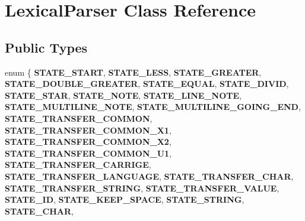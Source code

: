 \hypertarget{class_lexical_parser}{}\section{Lexical\+Parser Class Reference}
\label{class_lexical_parser}
\subsection*{Public Types}
\begin{DoxyCompactItemize}
\item 
\mbox{\label{class_lexical_parser_ad0c3684f404a4ac58f189d49f89344c7}} 
enum \{ \newline
{\bfseries S\+T\+A\+T\+E\+\_\+\+S\+T\+A\+RT}, 
{\bfseries S\+T\+A\+T\+E\+\_\+\+L\+E\+SS}, 
{\bfseries S\+T\+A\+T\+E\+\_\+\+G\+R\+E\+A\+T\+ER}, 
{\bfseries S\+T\+A\+T\+E\+\_\+\+D\+O\+U\+B\+L\+E\+\_\+\+G\+R\+E\+A\+T\+ER}, 
\newline
{\bfseries S\+T\+A\+T\+E\+\_\+\+E\+Q\+U\+AL}, 
{\bfseries S\+T\+A\+T\+E\+\_\+\+D\+I\+V\+ID}, 
{\bfseries S\+T\+A\+T\+E\+\_\+\+S\+T\+AR}, 
{\bfseries S\+T\+A\+T\+E\+\_\+\+N\+O\+TE}, 
\newline
{\bfseries S\+T\+A\+T\+E\+\_\+\+L\+I\+N\+E\+\_\+\+N\+O\+TE}, 
{\bfseries S\+T\+A\+T\+E\+\_\+\+M\+U\+L\+T\+I\+L\+I\+N\+E\+\_\+\+N\+O\+TE}, 
{\bfseries S\+T\+A\+T\+E\+\_\+\+M\+U\+L\+T\+I\+L\+I\+N\+E\+\_\+\+G\+O\+I\+N\+G\+\_\+\+E\+ND}, 
{\bfseries S\+T\+A\+T\+E\+\_\+\+T\+R\+A\+N\+S\+F\+E\+R\+\_\+\+C\+O\+M\+M\+ON}, 
\newline
{\bfseries S\+T\+A\+T\+E\+\_\+\+T\+R\+A\+N\+S\+F\+E\+R\+\_\+\+C\+O\+M\+M\+O\+N\+\_\+\+X1}, 
{\bfseries S\+T\+A\+T\+E\+\_\+\+T\+R\+A\+N\+S\+F\+E\+R\+\_\+\+C\+O\+M\+M\+O\+N\+\_\+\+X2}, 
{\bfseries S\+T\+A\+T\+E\+\_\+\+T\+R\+A\+N\+S\+F\+E\+R\+\_\+\+C\+O\+M\+M\+O\+N\+\_\+\+U1}, 
{\bfseries S\+T\+A\+T\+E\+\_\+\+T\+R\+A\+N\+S\+F\+E\+R\+\_\+\+C\+A\+R\+R\+I\+GE}, 
\newline
{\bfseries S\+T\+A\+T\+E\+\_\+\+T\+R\+A\+N\+S\+F\+E\+R\+\_\+\+L\+A\+N\+G\+U\+A\+GE}, 
{\bfseries S\+T\+A\+T\+E\+\_\+\+T\+R\+A\+N\+S\+F\+E\+R\+\_\+\+C\+H\+AR}, 
{\bfseries S\+T\+A\+T\+E\+\_\+\+T\+R\+A\+N\+S\+F\+E\+R\+\_\+\+S\+T\+R\+I\+NG}, 
{\bfseries S\+T\+A\+T\+E\+\_\+\+T\+R\+A\+N\+S\+F\+E\+R\+\_\+\+V\+A\+L\+UE}, 
\newline
{\bfseries S\+T\+A\+T\+E\+\_\+\+ID}, 
{\bfseries S\+T\+A\+T\+E\+\_\+\+K\+E\+E\+P\+\_\+\+S\+P\+A\+CE}, 
{\bfseries S\+T\+A\+T\+E\+\_\+\+S\+T\+R\+I\+NG}, 
{\bfseries S\+T\+A\+T\+E\+\_\+\+C\+H\+AR}, 

\end{DoxyCompactItemize}
